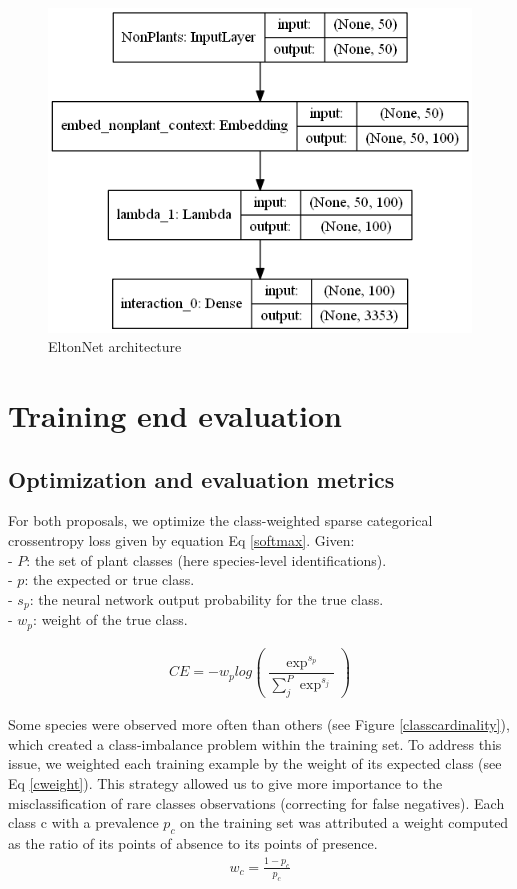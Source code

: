 \documentclass[]{article}
\begin{document}
\begin{figure}[h]
	\centering
	\includegraphics[scale=0.3]{elton}
	\caption{EltonNet architecture}
	\label{eltonnet}
\end{figure}

\section{Training end evaluation}
\subsection{Optimization and evaluation metrics}
For both proposals, we optimize the class-weighted sparse categorical crossentropy loss given by equation Eq \ref{softmax}. Given:\\
- $ P $: the set of plant classes (here species-level identifications).\\
- $ p $: the expected or true class.\\
- $s_p$: the neural network output probability for the true class.\\
- $w_p$: weight of the true class.

\begin{gather}
CE = - w_p log(\dfrac{\exp^{s_p}}{\sum_{j}^{P} \exp^{s_j}})
\label{softmax}
\end{gather}

\noindent Some species were observed more often than others (see Figure \ref{classcardinality}), which created a class-imbalance problem within the training set. To address this issue, we weighted each training example by the weight of its expected class (see Eq \ref{cweight}). This strategy allowed us to give more importance to the misclassification of rare classes observations (correcting for false negatives).  Each class c with a prevalence $p_c$ on the training set was attributed a weight computed as the ratio of its points of absence to its points of presence. 
\begin{gather}
w_c = \frac{1-p_c}{p_c}
\label{cweight}
\end{gather}  
\end{document}
